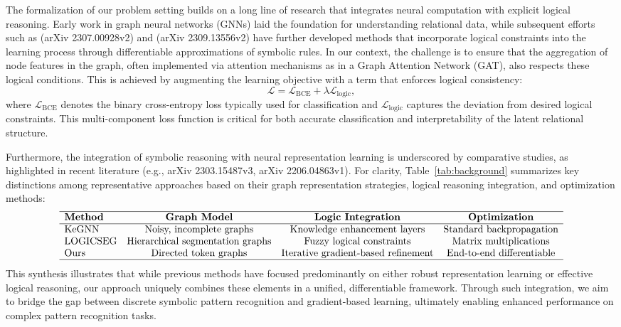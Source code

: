 \documentclass{article}
\begin{document}
The formalization of our problem setting builds on a long line of research that integrates neural computation with explicit logical reasoning. Early work in graph neural networks (GNNs) laid the foundation for understanding relational data, while subsequent efforts such as (arXiv 2307.00928v2) and (arXiv 2309.13556v2) have further developed methods that incorporate logical constraints into the learning process through differentiable approximations of symbolic rules. In our context, the challenge is to ensure that the aggregation of node features in the graph, often implemented via attention mechanisms as in a Graph Attention Network (GAT), also respects these logical conditions. This is achieved by augmenting the learning objective with a term that enforces logical consistency:
\[
\mathcal{L} = \mathcal{L}_{\text{BCE}} + \lambda\mathcal{L}_{\text{logic}},
\]
where \(\mathcal{L}_{\text{BCE}}\) denotes the binary cross-entropy loss typically used for classification and \(\mathcal{L}_{\text{logic}}\) captures the deviation from desired logical constraints. This multi-component loss function is critical for both accurate classification and interpretability of the latent relational structure.

Furthermore, the integration of symbolic reasoning with neural representation learning is underscored by comparative studies, as highlighted in recent literature (e.g., arXiv 2303.15487v3, arXiv 2206.04863v1). For clarity, Table~\ref{tab:background} summarizes key distinctions among representative approaches based on their graph representation strategies, logical reasoning integration, and optimization methods:
\[
\begin{array}{lccc}
\hline
\textbf{Method} & \textbf{Graph Model} & \textbf{Logic Integration} & \textbf{Optimization} \\
\hline
\text{KeGNN} & \text{Noisy, incomplete graphs} & \text{Knowledge enhancement layers} & \text{Standard backpropagation} \\
\text{LOGICSEG} & \text{Hierarchical segmentation graphs} & \text{Fuzzy logical constraints} & \text{Matrix multiplications} \\
\text{Ours} & \text{Directed token graphs} & \text{Iterative gradient-based refinement} & \text{End-to-end differentiable} \\
\hline
\end{array}
\]
This synthesis illustrates that while previous methods have focused predominantly on either robust representation learning or effective logical reasoning, our approach uniquely combines these elements in a unified, differentiable framework. Through such integration, we aim to bridge the gap between discrete symbolic pattern recognition and gradient-based learning, ultimately enabling enhanced performance on complex pattern recognition tasks.
\end{document}
